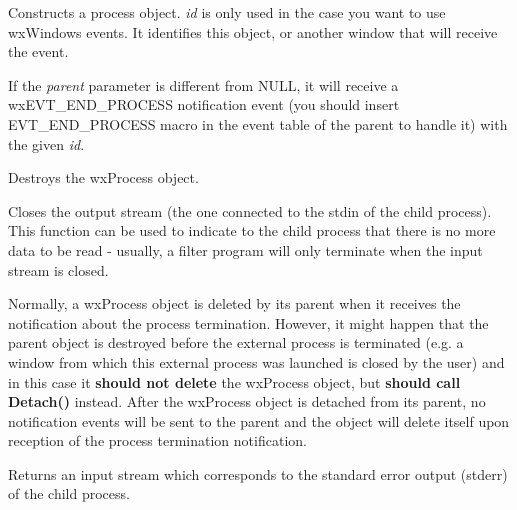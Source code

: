 Constructs a process object. {\it id} is only used in the case you want to
use wxWindows events. It identifies this object, or another window that will
receive the event.

If the {\it parent} parameter is different from NULL, it will receive
a wxEVT\_END\_PROCESS notification event (you should insert EVT\_END\_PROCESS
macro in the event table of the parent to handle it) with the given {\it id}.






Destroys the wxProcess object.

\label{wxprocesscloseoutput}


Closes the output stream (the one connected to the stdin of the child
process). This function can be used to indicate to the child process that
there is no more data to be read - usually, a filter program will only
terminate when the input stream is closed.

\label{wxprocessdetach}


Normally, a wxProcess object is deleted by its parent when it receives the
notification about the process termination. However, it might happen that the
parent object is destroyed before the external process is terminated (e.g. a
window from which this external process was launched is closed by the user)
and in this case it {\bf should not delete} the wxProcess object, but 
{\bf should call Detach()} instead. After the wxProcess object is detached
from its parent, no notification events will be sent to the parent and the
object will delete itself upon reception of the process termination
notification.

\label{wxprocessgeterrorstream}


Returns an input stream which corresponds to the standard error output (stderr)
of the child process.

\label{wxprocessgetinputstream}

